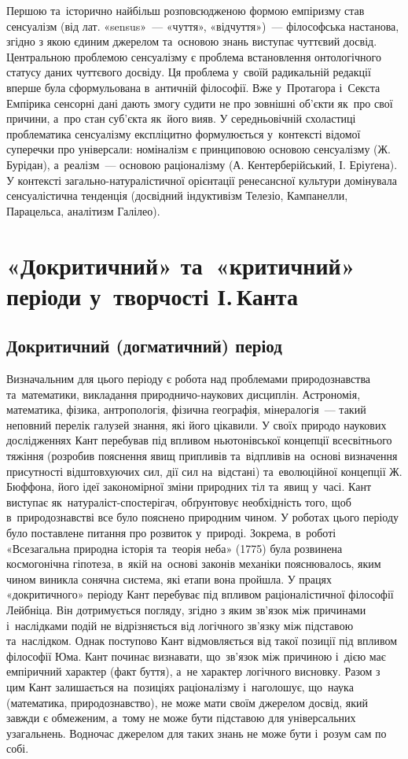 \documentclass[a5paper,oneside,DIV=12,12pt,headings=small]{scrartcl}
\begin{document}
		Першою та~історично найбільш розповсюдженою формою емпіризму став сенсуалізм (від лат. «sensus»~— «чуття», «відчуття»)~— філософська настанова, згідно з якою єдиним джерелом та~основою знань виступає чуттєвий досвід. Центральною проблемою сенсуалізму є проблема встановлення онтологічного статусу даних чуттєвого досвіду. Ця проблема у~своїй радикальній редакції вперше була сформульована в~античній філософії. Вже у~Протагора і~Секста Емпірика сенсорні дані дають змогу судити не про зовнішні об'єкти як~про свої причини, а~про стан суб'єкта як~його вияв. У середньовічній схоластиці проблематика сенсуалізму експліцитно формулюється у~контексті відомої суперечки про універсали: номіналізм є принциповою основою сенсуалізму (Ж. Бурідан), а~реалізм~— основою раціоналізму (А. Кентерберійський, І. Еріуґена). У контексті за\-галь\-но-на\-ту\-ра\-ліс\-тич\-ної орієнтації ренесансної культури домінувала сенсуалістична тенденція (досвідний індуктивізм Телезіо, Кампанелли, Парацельса, аналітизм Галілео).
		
	\section{«Докритичний» та~«критичний» періоди у~творчості І.\,Канта}
		\subsection{Докритичний (догматичний) період}	
			Визначальним для цього періоду є робота над проблемами природознавства та~математики, викладання при\-род\-ни\-чо-на\-у\-ко\-вих дисциплін. Астрономія, математика, фізика, антропологія, фізична географія, мінералогія~— такий неповний перелік галузей знання, які його цікавили. У своїх природо наукових дослідженнях Кант перебував під впливом ньютонівської концепції всесвітнього тяжіння (розробив пояснення явищ припливів та~відпливів на~основі визначення присутності відштовхуючих сил, дії сил на~відстані) та~еволюційної концепції Ж. Бюффона, його ідеї закономірної зміни природних тіл та~явищ у~часі. Кант виступає як~натураліст-спостерігач, обґрунтовує необхідність того, щоб в~природознавстві все було пояснено природним чином. У роботах цього періоду було поставлене питання про розвиток у~природі. Зокрема, в~роботі «Всезагальна природна історія та~теорія неба» (1775) була розвинена космогонічна гіпотеза, в~якій на~основі законів механіки пояснювалось, яким чином виникла сонячна система, які етапи вона пройшла. У працях «докритичного» періоду Кант перебуває під впливом раціоналістичної філософії Лейбніца. Він дотримується погляду, згідно з яким зв'язок між причинами і~наслідками подій не відрізняється від логічного зв'язку між підставою та~наслідком. Однак поступово Кант відмовляється від такої позиції під впливом філософії Юма. Кант починає визнавати, що~зв'язок між причиною і~дією має емпіричний характер (факт буття), а~не характер логічного висновку. Разом з цим Кант залишається на~позиціях раціоналізму і~наголошує, що~наука (математика, природознавство), не може мати своїм джерелом досвід, який завжди є обмеженим, а~тому не може бути підставою для універсальних узагальнень. Водночас джерелом для таких знань не може бути і~розум сам по собі. 
		
\end{document}
